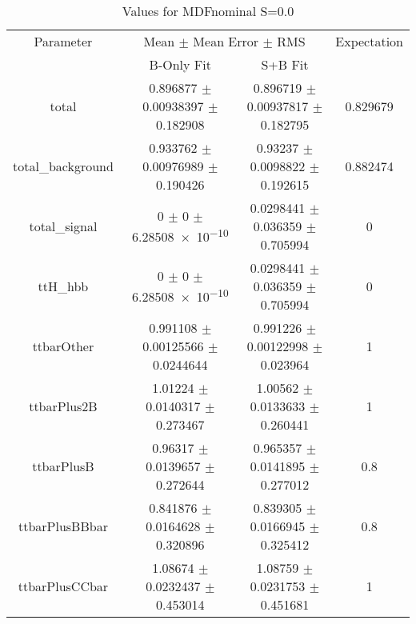 \begin{table}
\centering
\caption{Values for MDFnominal S=0.0}
\begin{tabular}{cccc}
\toprule
Parameter & \multicolumn{2}{c}{Mean $\pm$ Mean Error $\pm$ RMS} & Expectation\\
 & B-Only Fit & S+B Fit & \\
\midrule
total & \num{0.896877} $\pm$ \num{0.00938397} $\pm$ \num{0.182908} & \num{0.896719} $\pm$ \num{0.00937817} $\pm$ \num{0.182795} & \num{0.829679}\\
total\_background & \num{0.933762} $\pm$ \num{0.00976989} $\pm$ \num{0.190426} & \num{0.93237} $\pm$ \num{0.0098822} $\pm$ \num{0.192615} & \num{0.882474}\\
total\_signal & \num{0} $\pm$ \num{0} $\pm$ \num{6.28508e-10} & \num{0.0298441} $\pm$ \num{0.036359} $\pm$ \num{0.705994} & \num{0}\\
ttH\_hbb & \num{0} $\pm$ \num{0} $\pm$ \num{6.28508e-10} & \num{0.0298441} $\pm$ \num{0.036359} $\pm$ \num{0.705994} & \num{0}\\
ttbarOther & \num{0.991108} $\pm$ \num{0.00125566} $\pm$ \num{0.0244644} & \num{0.991226} $\pm$ \num{0.00122998} $\pm$ \num{0.023964} & \num{1}\\
ttbarPlus2B & \num{1.01224} $\pm$ \num{0.0140317} $\pm$ \num{0.273467} & \num{1.00562} $\pm$ \num{0.0133633} $\pm$ \num{0.260441} & \num{1}\\
ttbarPlusB & \num{0.96317} $\pm$ \num{0.0139657} $\pm$ \num{0.272644} & \num{0.965357} $\pm$ \num{0.0141895} $\pm$ \num{0.277012} & \num{0.8}\\
ttbarPlusBBbar & \num{0.841876} $\pm$ \num{0.0164628} $\pm$ \num{0.320896} & \num{0.839305} $\pm$ \num{0.0166945} $\pm$ \num{0.325412} & \num{0.8}\\
ttbarPlusCCbar & \num{1.08674} $\pm$ \num{0.0232437} $\pm$ \num{0.453014} & \num{1.08759} $\pm$ \num{0.0231753} $\pm$ \num{0.451681} & \num{1}\\
\bottomrule
\end{tabular}
\end{table}